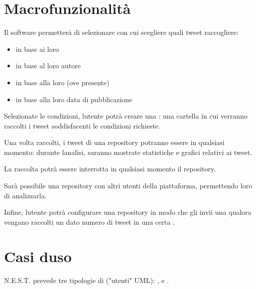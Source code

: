 \documentclass[letterpaper,10pt,italian]{sphinxmanual}
\begin{document}
\section{Macro\sphinxhyphen{}funzionalità}
\label{\detokenize{development/goals:macro-funzionalita}}
\sphinxAtStartPar
Il software permetterà di selezionare  con cui scegliere quali tweet raccogliere:
\begin{itemize}
\item {} 
\sphinxAtStartPar
in base ai loro 

\item {} 
\sphinxAtStartPar
in base al loro autore

\item {} 
\sphinxAtStartPar
in base alla loro  (ove presente)

\item {} 
\sphinxAtStartPar
in base alla loro data di pubblicazione

\end{itemize}

\sphinxAtStartPar
Selezionate le condizioni, l\textquotesingle{}utente potrà creare una : una cartella in cui verranno raccolti i tweet
soddisfacenti le condizioni richieste.

\sphinxAtStartPar
Una volta raccolti, i tweet di una repository potranno essere  in qualsiasi momento: durante l\textquotesingle{}analisi,
saranno mostrate statistiche e grafici relativi ai tweet.

\sphinxAtStartPar
La raccolta potrà essere interrotta in qualsiasi momento  il repository.

\sphinxAtStartPar
Sarà possibile  una repository con altri utenti della piattaforma, permettendo loro di analizzarla.

\sphinxAtStartPar
Infine, l\textquotesingle{}utente potrà configurare una repository in modo che gli invii una  qualora vengano raccolti un dato
numero di tweet in una certa .


\section{Casi d\textquotesingle{}uso}
\label{\detokenize{development/goals:casi-d-uso}}
\sphinxAtStartPar
N.E.S.T. prevede tre tipologie di  ("utenti" UML): ,  e .
\end{document}
